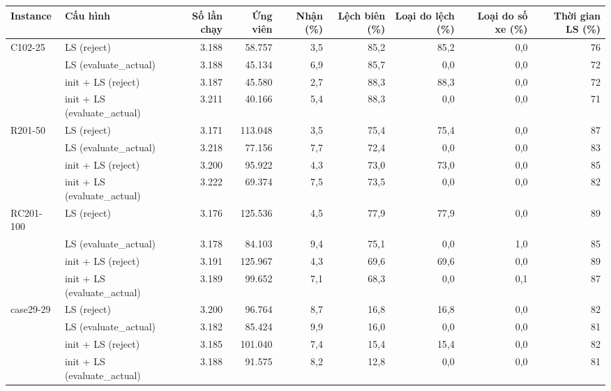\begin{tabular}{@{}llrrrrrrr@{}}
\toprule
Instance & Cấu hình & Số lần chạy & Ứng viên & Nhận (\%) & Lệch biên (\%) & Loại do lệch (\%) & Loại do số xe (\%) & Thời gian LS (\%) \\
\midrule
C102-25 & LS (reject) & 3.188 & 58.757 & 3{,}5 & 85{,}2 & 85{,}2 & 0{,}0 & 76 \\
 & LS (evaluate\_actual) & 3.188 & 45.134 & 6{,}9 & 85{,}7 & 0{,}0 & 0{,}0 & 72 \\
 & init + LS (reject) & 3.187 & 45.580 & 2{,}7 & 88{,}3 & 88{,}3 & 0{,}0 & 72 \\
 & init + LS (evaluate\_actual) & 3.211 & 40.166 & 5{,}4 & 88{,}3 & 0{,}0 & 0{,}0 & 71 \\
\midrule
R201-50 & LS (reject) & 3.171 & 113.048 & 3{,}5 & 75{,}4 & 75{,}4 & 0{,}0 & 87 \\
 & LS (evaluate\_actual) & 3.218 & 77.156 & 7{,}7 & 72{,}4 & 0{,}0 & 0{,}0 & 83 \\
 & init + LS (reject) & 3.200 & 95.922 & 4{,}3 & 73{,}0 & 73{,}0 & 0{,}0 & 85 \\
 & init + LS (evaluate\_actual) & 3.222 & 69.374 & 7{,}5 & 73{,}5 & 0{,}0 & 0{,}0 & 82 \\
\midrule
RC201-100 & LS (reject) & 3.176 & 125.536 & 4{,}5 & 77{,}9 & 77{,}9 & 0{,}0 & 89 \\
 & LS (evaluate\_actual) & 3.178 & 84.103 & 9{,}4 & 75{,}1 & 0{,}0 & 1{,}0 & 85 \\
 & init + LS (reject) & 3.191 & 125.967 & 4{,}3 & 69{,}6 & 69{,}6 & 0{,}0 & 89 \\
 & init + LS (evaluate\_actual) & 3.189 & 99.652 & 7{,}1 & 68{,}3 & 0{,}0 & 0{,}1 & 87 \\
\midrule
case29-29 & LS (reject) & 3.200 & 96.764 & 8{,}7 & 16{,}8 & 16{,}8 & 0{,}0 & 82 \\
 & LS (evaluate\_actual) & 3.182 & 85.424 & 9{,}9 & 16{,}0 & 0{,}0 & 0{,}0 & 81 \\
 & init + LS (reject) & 3.185 & 101.040 & 7{,}4 & 15{,}4 & 15{,}4 & 0{,}0 & 82 \\
 & init + LS (evaluate\_actual) & 3.188 & 91.575 & 8{,}2 & 12{,}8 & 0{,}0 & 0{,}0 & 81 \\

\bottomrule
\end{tabular}
